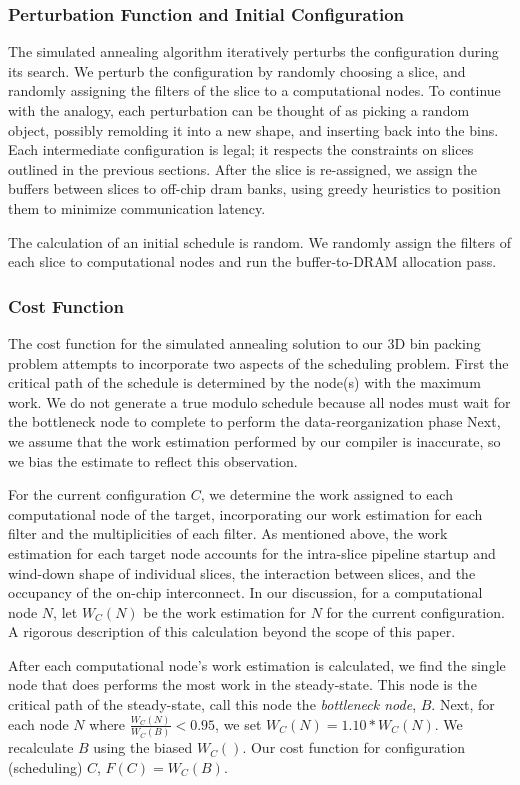 \subsubsection{Perturbation Function and Initial Configuration}
The simulated annealing algorithm iteratively perturbs the
configuration during its search.  We perturb the configuration by
randomly choosing a slice, and randomly assigning the filters of the
slice to a computational nodes.  To continue with the analogy, each
perturbation can be thought of as picking a random object, possibly
remolding it into a new shape, and inserting back into the bins. Each
intermediate configuration is legal; it respects the constraints on
slices outlined in the previous sections.  After the slice is
re-assigned, we assign the buffers between slices to off-chip dram
banks, using greedy heuristics to position them to minimize
communication latency.

The calculation of an initial schedule is random.  We randomly assign
the filters of each slice to computational nodes and run the
buffer-to-DRAM allocation pass.  

\subsubsection{Cost Function}
The cost function for the simulated annealing solution to our 3D bin
packing problem attempts to incorporate two aspects of the
scheduling problem.  First the critical path of the schedule is
determined by the node(s) with the maximum work.  We do not generate a
true modulo schedule because all nodes must wait for the bottleneck
node to complete to perform the data-reorganization phase Next, we
assume that the work estimation performed by our compiler is
inaccurate, so we bias the estimate to reflect this observation.

For the current configuration $C$, we determine the work assigned to
each computational node of the target, incorporating our work
estimation for each filter and the multiplicities of each filter.  As
mentioned above, the work estimation for each target node accounts for
the intra-slice pipeline startup and wind-down shape of individual
slices, the interaction between slices, and the occupancy of the
on-chip interconnect.  In our discussion, for a computational node
$N$, let $W_C(N)$ be the work estimation for $N$ for the current
configuration.  A rigorous description of this calculation beyond the
scope of this paper.

After each computational node's work estimation is calculated, we find
the single node that does performs the most work in the
steady-state. This node is the critical path of the steady-state, call
this node the {\it bottleneck node}, $B$. Next, for each node $N$
where $\frac{W_C(N)}{W_C(B)} < 0.95$, we set $W_C(N) = 1.10 * W_C(N)$.
We recalculate $B$ using the biased $W_C()$. Our cost function for
configuration (scheduling) $C$, $F(C) = W_C(B)$.

